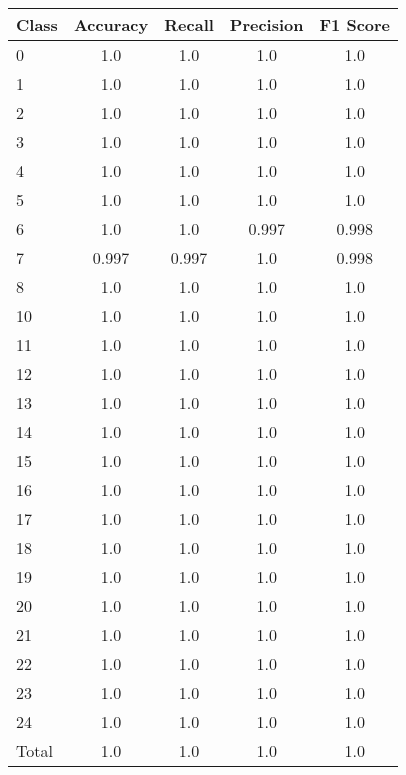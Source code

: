 \begin{tabular}{l c c c c}
Class & Accuracy & Recall & Precision & F1 Score\\ \hline
0 & 1.0 & 1.0 & 1.0 & 1.0\\
1 & 1.0 & 1.0 & 1.0 & 1.0\\
2 & 1.0 & 1.0 & 1.0 & 1.0\\
3 & 1.0 & 1.0 & 1.0 & 1.0\\
4 & 1.0 & 1.0 & 1.0 & 1.0\\
5 & 1.0 & 1.0 & 1.0 & 1.0\\
6 & 1.0 & 1.0 & 0.997 & 0.998\\
7 & 0.997 & 0.997 & 1.0 & 0.998\\
8 & 1.0 & 1.0 & 1.0 & 1.0\\
10 & 1.0 & 1.0 & 1.0 & 1.0\\
11 & 1.0 & 1.0 & 1.0 & 1.0\\
12 & 1.0 & 1.0 & 1.0 & 1.0\\
13 & 1.0 & 1.0 & 1.0 & 1.0\\
14 & 1.0 & 1.0 & 1.0 & 1.0\\
15 & 1.0 & 1.0 & 1.0 & 1.0\\
16 & 1.0 & 1.0 & 1.0 & 1.0\\
17 & 1.0 & 1.0 & 1.0 & 1.0\\
18 & 1.0 & 1.0 & 1.0 & 1.0\\
19 & 1.0 & 1.0 & 1.0 & 1.0\\
20 & 1.0 & 1.0 & 1.0 & 1.0\\
21 & 1.0 & 1.0 & 1.0 & 1.0\\
22 & 1.0 & 1.0 & 1.0 & 1.0\\
23 & 1.0 & 1.0 & 1.0 & 1.0\\
24 & 1.0 & 1.0 & 1.0 & 1.0\\
\hline
Total & 1.0 & 1.0 & 1.0 & 1.0\\
\end{tabular}
